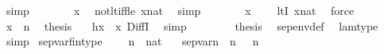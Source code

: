 \begin{isabellebody}
\ simp\isanewline
\ \ \ \ \isamarkupfalse%
\ \isamarkupfalse%
\ {\isachardoublequoteopen}{\isasymnot}x{\isacharhash}{\kern0pt}{\isacharplus}{\kern0pt}{}{\isacharless}{\kern0pt}{}{\isachardoublequoteclose}\ \isamarkupfalse%
\ not{\isacharunderscore}{\kern0pt}lt{\isacharunderscore}{\kern0pt}iff{\isacharunderscore}{\kern0pt}le\ {\isacartoucheopen}x{\isasymin}nat{\isacartoucheclose}\ \isamarkupfalse%
\ simp\isanewline
\ \ \ \ \isamarkupfalse%
\ \isamarkupfalse%
\ {\isachardoublequoteopen}x{\isacharhash}{\kern0pt}{\isacharplus}{\kern0pt}{}\ {\isasymnotin}\ {}{\isachardoublequoteclose}\ \isamarkupfalse%
\ ltI\ {\isacartoucheopen}x{\isasymin}nat{\isacartoucheclose}\ \isamarkupfalse%
\ force\isanewline
\ \ \ \ \isamarkupfalse%
\ {\isacartoucheopen}x{\isacharhash}{\kern0pt}{\isacharplus}{\kern0pt}{}\ {\isasymin}\ {}{\isacharhash}{\kern0pt}{\isacharplus}{\kern0pt}n{\isacartoucheclose}\ \isamarkupfalse%
\ {\isacharquery}{\kern0pt}thesis\ \isamarkupfalse%
\ \ {\isacartoucheopen}{\isacharquery}{\kern0pt}h{\isacharbackquote}{\kern0pt}x\ {\isacharequal}{\kern0pt}\ x{\isacharhash}{\kern0pt}{\isacharplus}{\kern0pt}{}{\isacartoucheclose}\ DiffI\ \isamarkupfalse%
\ simp\isanewline
\ \ \isamarkupfalse%
\isanewline
\ \ \isamarkupfalse%
\ \isamarkupfalse%
\ {\isacharquery}{\kern0pt}thesis\ \isamarkupfalse%
\ sep{\isacharunderscore}{\kern0pt}env{\isacharunderscore}{\kern0pt}def\ \isamarkupfalse%
\ lam{\isacharunderscore}{\kern0pt}type\ \isamarkupfalse%
\ simp\isanewline
{}\isamarkupfalse%
%
\endisatagproof
{\isafoldproof}%
%
\isadelimproof
\isanewline
%
\endisadelimproof
\isanewline
{}\isamarkupfalse%
\ sep{\isacharunderscore}{\kern0pt}var{\isacharunderscore}{\kern0pt}fin{\isacharunderscore}{\kern0pt}type\ {\isacharcolon}{\kern0pt}\isanewline
\ \ \ {\isachardoublequoteopen}n\ {\isasymin}\ nat{\isachardoublequoteclose}\isanewline
\ \ \ {\isachardoublequoteopen}sep{\isacharunderscore}{\kern0pt}var{\isacharparenleft}{\kern0pt}n{\isacharparenright}{\kern0pt}\ {\isacharcolon}{\kern0pt}\ {}{\isacharhash}{\kern0pt}{\isacharplus}{\kern0pt}n\ \ {\isacharminus}{\kern0pt}{\isacharbar}{\kern0pt}{\isacharbar}{\kern0pt}{\isachargreater}{\kern0pt}\ {}{\isacharhash}{\kern0pt}{\isacharplus}{\kern0pt}n{\isachardoublequoteclose}\isanewline

\end{isabellebody}
